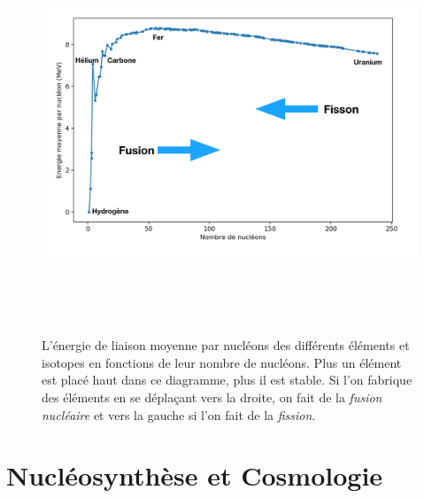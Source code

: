 \begin{figure}[htbp]
	\centering
		\includegraphics[height=12cm]{figs/binding.png}
	\caption[Energies de liaisons des différents éléments]{L'énergie de liaison moyenne par nucléons des différents éléments et isotopes en fonctions de leur nombre de nucléons. Plus un élément est placé haut dans ce diagramme, plus il est stable. Si l'on fabrique des éléments en se déplaçant vers la droite, on fait de la \textit{fusion nucléaire} et vers la gauche si l'on fait de la \textit{fission}.}
	\label{f:binding}
\end{figure}

\section{Nucléosynthèse et Cosmologie}

